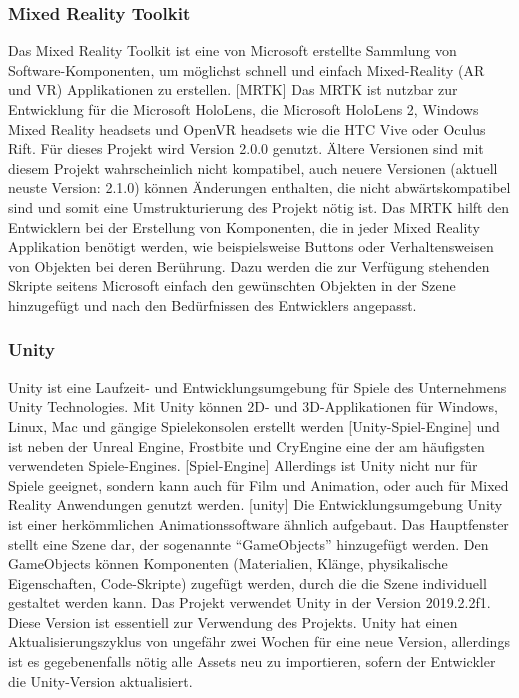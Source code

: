 \documentclass[11pt, titlepage, fleqn]{report}
\begin{document}
                \subsubsection{Mixed Reality Toolkit}
                    Das Mixed Reality Toolkit ist eine von Microsoft erstellte Sammlung von Software-Komponenten, um möglichst schnell und einfach 
                    Mixed-Reality (AR und VR) Applikationen zu erstellen. [MRTK]\newline
                    Das MRTK ist nutzbar zur Entwicklung für die Microsoft HoloLens, die Microsoft HoloLens 2, Windows Mixed Reality headsets und OpenVR 
                    headsets wie die HTC Vive oder Oculus Rift.
                    Für dieses Projekt wird Version 2.0.0 genutzt. Ältere Versionen sind mit diesem Projekt wahrscheinlich nicht kompatibel, 
                    auch neuere Versionen (aktuell neuste Version: 2.1.0) können Änderungen enthalten, die nicht abwärtskompatibel sind und 
                    somit eine Umstrukturierung des Projekt nötig ist.\newline
                    Das MRTK hilft den Entwicklern bei der Erstellung von Komponenten, die in jeder Mixed Reality Applikation benötigt werden, 
                    wie beispielsweise Buttons oder Verhaltensweisen von Objekten bei deren Berührung. Dazu werden die zur Verfügung stehenden Skripte
                     seitens Microsoft einfach den gewünschten Objekten in der Szene hinzugefügt und nach den Bedürfnissen des Entwicklers angepasst.
                
                \subsubsection{Unity}
                    Unity ist eine Laufzeit- und Entwicklungsumgebung für Spiele des Unternehmens Unity Technologies. Mit Unity können 2D- und 
                    3D-Applikationen für Windows, Linux, Mac und gängige Spielekonsolen erstellt werden [Unity-Spiel-Engine] und ist neben der 
                    Unreal Engine, Frostbite und CryEngine eine der am häufigsten verwendeten Spiele-Engines. [Spiel-Engine]\newline
                    Allerdings ist Unity nicht nur für Spiele geeignet, sondern kann auch für Film und Animation, oder auch für Mixed Reality 
                    Anwendungen genutzt werden. [unity]\newline
                    Die Entwicklungsumgebung Unity ist einer herkömmlichen Animationssoftware ähnlich aufgebaut. Das Hauptfenster stellt eine Szene dar,
                    der sogenannte “GameObjects” hinzugefügt werden. Den GameObjects können Komponenten (Materialien, Klänge, physikalische Eigenschaften, 
                    Code-Skripte) zugefügt werden, durch die die Szene individuell gestaltet werden kann.\newline
                    Das Projekt verwendet Unity in der Version 2019.2.2f1. Diese Version ist essentiell zur Verwendung des Projekts. Unity hat einen 
                    Aktualisierungszyklus von ungefähr zwei Wochen für eine neue Version, allerdings ist es gegebenenfalls nötig alle Assets neu 
                    zu importieren, sofern der Entwickler die Unity-Version aktualisiert.
\end{document}
